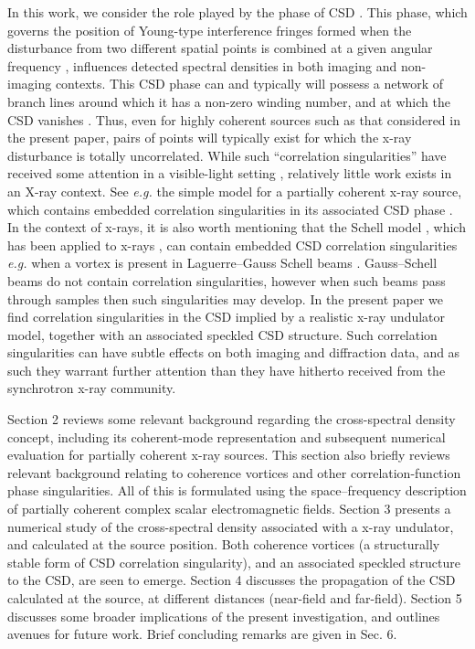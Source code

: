 \documentclass{iucr}              %
\begin{document}
In this work, we consider the role played by the phase of CSD \cite{Schouten2003,GburVisser2003,Bogatyryova2003}. This phase, which governs the position of Young-type interference fringes formed when the disturbance from two different spatial points is combined at a given angular frequency \cite{mandel_wolf}, influences detected spectral densities in both imaging and non-imaging contexts.  This CSD phase can and typically will possess a network of branch lines around which it has a non-zero winding number, and at which the CSD vanishes \cite{TopologicalReactionsCohVortices,Marasinghe2010}.  Thus, even for highly coherent sources such as that considered in the present paper, pairs of points will typically exist for which the x-ray disturbance is totally uncorrelated.  While such ``correlation singularities'' have received some attention in a visible-light setting \cite{Schouten2003,GburVisser2003,Bogatyryova2003,FischerVisser2004,Palacios2004,GburVisser2006,Wang2006,TopologicalReactionsCohVortices,GburVisser2010,Rodrigo2015}, relatively little work exists in an X-ray context.  See {\em e.g.} the simple model for a partially coherent x-ray source, which contains embedded correlation singularities in its associated CSD phase  \cite{PellicciaPaganin2012}.   In the context of x-rays, it is also worth mentioning that the Schell model \cite{mandel_wolf}, which has been applied to x-rays \cite{Coisson1997,Vartanyants2010}, can contain embedded CSD correlation singularities {\color{blue} {\em e.g.} when a vortex is present in Laguerre--Gauss Schell beams \cite{Palacios2004,Rodrigo2015}.  Gauss--Schell beams do not contain correlation singularities, however when such beams pass through samples then such singularities may develop.} In the present paper we find correlation singularities in the CSD implied by a realistic x-ray undulator model, together with an associated speckled CSD structure. Such correlation singularities can have subtle effects on both imaging and diffraction data, and as such they warrant further attention than they have hitherto received from the synchrotron x-ray community.

Section 2 reviews some relevant background regarding the cross-spectral density concept, including its coherent-mode representation and subsequent numerical evaluation for partially coherent x-ray sources.  This section also briefly reviews relevant background relating to coherence vortices and other correlation-function phase singularities.  All of this is formulated using the space--frequency description of partially coherent complex scalar electromagnetic fields.  Section 3 presents a numerical study of the cross-spectral density associated with a x-ray undulator, and calculated at the source position.  Both coherence vortices (a structurally stable form of CSD correlation singularity), and an associated speckled structure to the CSD, are seen to emerge. Section 4 discusses the propagation of the CSD calculated at the source, at different distances (near-field and far-field). Section 5 discusses some broader implications of the present investigation, and outlines avenues for future work.  Brief concluding remarks are given in Sec. 6.
\end{document}
